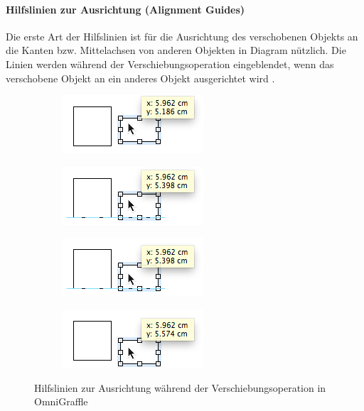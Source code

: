 \paragraph{Hilfslinien zur Ausrichtung (Alignment Guides)}

Die erste Art der Hilfslinien ist für die Ausrichtung des verschobenen Objekts an die Kanten bzw. Mittelachsen von anderen Objekten in Diagram nützlich. Die Linien werden während der Verschiebungsoperation eingeblendet, wenn das verschobene Objekt an ein anderes Objekt ausgerichtet wird \cite{11Keynote}.

\begin{figure}[hbt]
    \newcommand{\subfigurewidth}{0.5\textwidth}
    \begin{subfigure}{\subfigurewidth}
        \centering
        \includegraphics{resources/omnigraffle-smart-guides-a}
        \caption{}
        \label{fig:omnigraffle-smart-guides-a}
    \end{subfigure}
    \begin{subfigure}{\subfigurewidth}
        \centering
        \includegraphics{resources/omnigraffle-smart-guides-b}
        \caption{}
        \label{fig:omnigraffle-smart-guides-b}
    \end{subfigure}
    \begin{subfigure}{\subfigurewidth}
        \centering
        \includegraphics{resources/omnigraffle-smart-guides-c}
        \caption{}
        \label{fig:omnigraffle-smart-guides-c}
    \end{subfigure}
    \begin{subfigure}{\subfigurewidth}
        \centering
        \includegraphics{resources/omnigraffle-smart-guides-d}
        \caption{}
        \label{fig:omnigraffle-smart-guides-d}
    \end{subfigure}
    \caption{Hilfslinien zur Ausrichtung während der Verschiebungsoperation in OmniGraffle}
    \label{fig:omnigraffle-smart-guides}
\end{figure}

